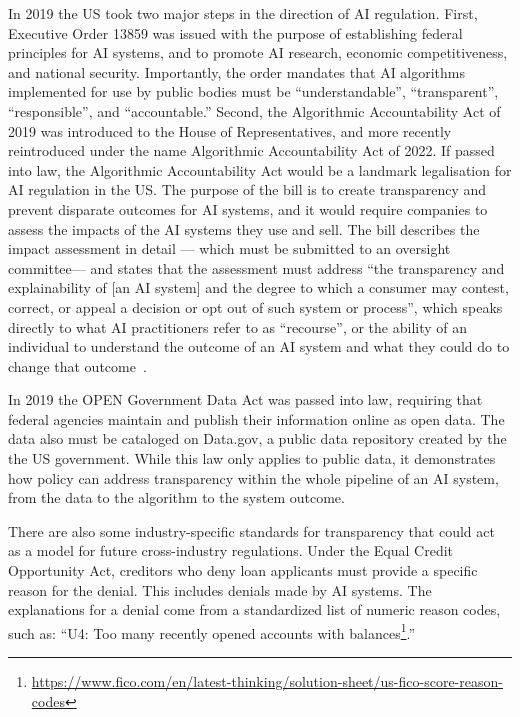 In 2019 the US took two major steps in the direction of AI regulation. First, Executive Order 13859 was issued with the purpose of establishing federal principles for AI systems, and to promote AI research, economic competitiveness, and national security. Importantly, the order mandates that AI algorithms implemented for use by public bodies must be ``understandable'', ``transparent'', ``responsible'', and ``accountable.'' Second, the Algorithmic Accountability Act of 2019 was introduced to the House of Representatives, and more recently reintroduced under the name Algorithmic Accountability Act of 2022. If passed into law, the Algorithmic Accountability Act would be a landmark legalisation for AI regulation in the US. The purpose of the bill is to create transparency and prevent disparate outcomes for AI systems, and it would require companies to assess the impacts of the AI systems they use and sell. The bill describes the impact assessment in detail --- which must be submitted to an oversight committee--- and states that the assessment must address ``the transparency and explainability of [an AI system] and the degree to which a consumer may contest, correct, or appeal a decision or opt out of such system or process'', %
which speaks directly to what AI practitioners refer to as ``recourse'', or the ability of an individual to understand the outcome of an AI system and what they could do to change that outcome~\cite{wachter2017counterfactual, ustun2019actionable}.

In 2019 the OPEN Government Data Act was passed into law, requiring that federal agencies maintain and publish their information online as open data. The data also must be cataloged on Data.gov, a public data repository created by the the US government. While this law only applies to public data, it demonstrates how policy can address transparency within the whole pipeline of an AI system, from the data to the algorithm to the system outcome.

There are also some industry-specific standards for transparency that could act as a model for future cross-industry regulations. Under the Equal Credit Opportunity Act, creditors who deny loan applicants must provide a specific reason for the denial. This includes denials made by AI systems. The explanations for a denial come from a standardized list of numeric reason codes, such as: ``U4: Too many recently opened accounts with balances\footnote{\url{https://www.fico.com/en/latest-thinking/solution-sheet/us-fico-score-reason-codes}}.''

